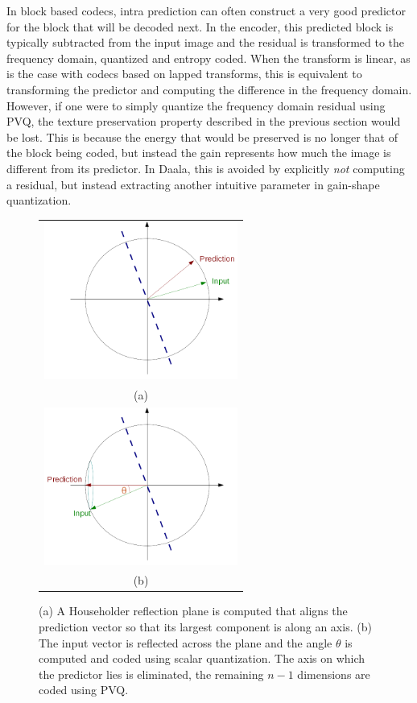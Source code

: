 \documentclass[conference, 10pt]{IEEEtran}
\begin{document}
In block based codecs, intra prediction can often construct a
 very good predictor for the block that will be decoded next.
In the encoder, this predicted block is typically subtracted from the input
 image and the residual is transformed to the frequency domain, quantized and
 entropy coded.
When the transform is linear, as is the case with codecs based on lapped
 transforms, this is equivalent to transforming the predictor and computing
 the difference in the frequency domain.
However, if one were to simply quantize the frequency domain residual using PVQ,
 the texture preservation property described in the previous section would be
 lost.
This is because the energy that would be preserved is no longer that of the
 block being coded, but instead the gain represents how much the image is
 different from its predictor.
In Daala, this is avoided by explicitly {\em not} computing a residual, but
 instead extracting another intuitive parameter in gain-shape quantization.

\begin{figure}
\begin{center}
\begin{tabular}{c}
  \includegraphics[natwidth=650,natheight=530,width=2.5in]{pvq_step3.png} \\
  (a) \\
  \includegraphics[natwidth=650,natheight=530,width=2.5in]{pvq_step6.png} \\
  (b)
\end{tabular}
\end{center}
\caption[pvq]{\label{fig:pvq} (a) A Householder reflection plane is computed
 that aligns the prediction vector so that its largest component is along an
 axis.  (b) The input vector is reflected across the plane and the angle
 $\theta$ is computed and coded using scalar quantization. The axis on which
 the predictor lies is eliminated, the remaining $n-1$ dimensions are coded
 using PVQ.}
\end{figure}
\end{document}
